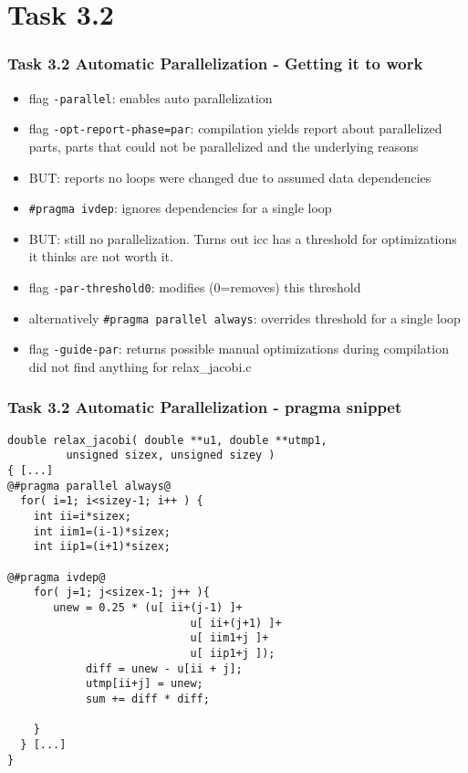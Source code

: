 \section{Task 3.2}
\begin{frame}[fragile]
\frametitle{Task 3.2 Automatic Parallelization - Getting it to work}
\begin{itemize}
\item flag \texttt{-parallel}: enables auto parallelization
\item flag \texttt{-opt-report-phase=par}: compilation yields report about parallelized parts, parts that could not be parallelized and the underlying reasons
\item BUT: reports no loops were changed due to assumed data dependencies
\item \texttt{\#pragma ivdep}: ignores dependencies for a single loop
\item BUT: still no parallelization. Turns out icc has a threshold for optimizations it thinks are not worth it. 
\item flag \texttt{-par-threshold0}: modifies (0=removes) this threshold
\item alternatively \texttt{\#pragma parallel always}: overrides threshold for a single loop 
\item flag \texttt{-guide-par}: returns possible manual optimizations during compilation\; did not find anything for relax\_jacobi.c 
\end{itemize}
\end{frame}

\begin{frame}[fragile]
\frametitle{Task 3.2 Automatic Parallelization - pragma snippet}
\begin{lstlisting}
double relax_jacobi( double **u1, double **utmp1,
         unsigned sizex, unsigned sizey )
{ [...]
@#pragma parallel always@
  for( i=1; i<sizey-1; i++ ) {
  	int ii=i*sizex;
  	int iim1=(i-1)*sizex;
  	int iip1=(i+1)*sizex;

@#pragma ivdep@
    for( j=1; j<sizex-1; j++ ){
       unew = 0.25 * (u[ ii+(j-1) ]+
        		            u[ ii+(j+1) ]+
        		            u[ iim1+j ]+
        		            u[ iip1+j ]);
		    diff = unew - u[ii + j];
		    utmp[ii+j] = unew;
		    sum += diff * diff;

    }
  } [...]
}
\end{lstlisting}
\end{frame}

